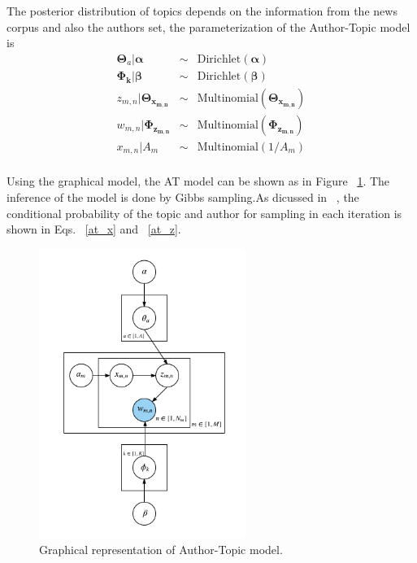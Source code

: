 {The posterior distribution of topics depends on the information from the news corpus and also the authors set, the parameterization of the Author-Topic model is 
\begin{eqnarray*} \label{eq:at}
\boldsymbol{\Theta}_a | \boldsymbol{\alpha} & \sim & \text{Dirichlet}(\boldsymbol{\alpha})\\
\boldsymbol{\Phi_{k}} | \boldsymbol{\beta} & \sim & \text{Dirichlet}(\boldsymbol{\beta})\\
z_{m,n} | \boldsymbol{\Theta_{x_{m,n}}} & \sim & \text{Multinomial}(\boldsymbol{\Theta_{x_{m,n}}})\\
w_{m,n} | \boldsymbol{\Phi_{z_{m,n}}} & \sim & \text{Multinomial}(\boldsymbol{\Phi_{z_{m,n}}})\\
x_{m,n} | A_m & \sim & \text{Multinomial}(1/A_m)\\

\end{eqnarray*}

Using the graphical model, the AT model can be shown as in Figure ~\ref{fig:at}. The inference of the model is done by Gibbs sampling.As dicussed in ~\cite{rosen2010learning}, the conditional probability of the topic and author for sampling in each iteration is shown in Eqs. ~\ref{at_x} and ~\ref{at_z}.
\begin{figure}[h]
\centering
\includegraphics[width=0.6\textwidth]{figures/AT.png}
\caption{Graphical representation of Author-Topic model.}
\label{fig:at}
\end{figure}

}

